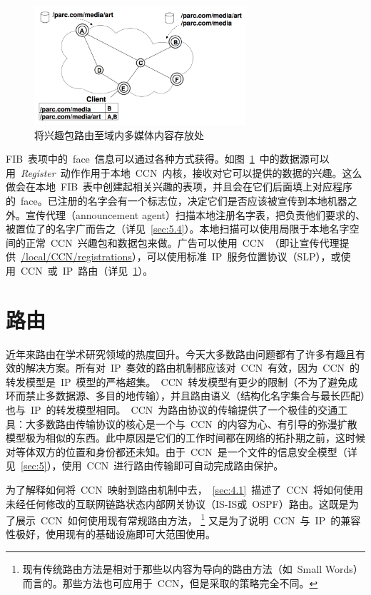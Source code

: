 \begin{figure}[htbp]
\begin{center}
\includegraphics[width=0.7\textwidth]{images/routing}
\caption{将兴趣包路由至域内多媒体内容存放处}
\label{routing}
\end{center}
\end{figure}

FIB~表项中的~face~信息可以通过各种方式获得。如图~\ref{routing}~中的数据源可以用~\emph{Register}~动作作用于本地~CCN~内核，接收对它可以提供的数据的兴趣。这么做会在本地~FIB~表中创建起相关兴趣的表项，并且会在它们后面填上对应程序的~face。已注册的名字会有一个标志位，决定它们是否应该被宣传到本地机器之外。宣传代理（announcement agent）扫描本地注册名字表，把负责他们要求的、被置位了的名字广而告之（详见~\ref{sec:5.4}）。本地扫描可以使用局限于本地名字空间的正常~CCN~兴趣包和数据包来做。广告可以使用~CCN~（即让宣传代理提供~\url{/local/CCN/registrations}），可以使用标准~IP~服务位置协议（SLP），或使用~CCN~或~IP~路由（详见~\ref{sec:4}）。%

\section{路由}
\label{sec:4}
近年来路由在学术研究领域的热度回升。今天大多数路由问题都有了许多有趣且有效的解决方案。所有对~IP~奏效的路由机制都应该对~CCN~有效，因为~CCN~的转发模型是~IP~模型的严格超集。~CCN~转发模型有更少的限制（不为了避免成环而禁止多数据源、多目的地传输），并且路由语义（结构化名字集合与最长匹配）也与~IP~的转发模型相同。~CCN~为路由协议的传输提供了一个极佳的交通工具：大多数路由传输协议的核心是一个与~CCN~的内容为心、有引导的弥漫扩散模型极为相似的东西。此中原因是它们的工作时间都在网络的拓扑期之前，这时候对等体双方的位置和身份都还未知。由于~CCN~是一个文件的信息安全模型（详见~\ref{sec:5}），使用~CCN~进行路由传输即可自动完成路由保护。

为了解释如何将~CCN~映射到路由机制中去，~\ref{sec:4.1}~描述了~CCN~将如何使用未经任何修改的互联网链路状态内部网关协议（IS-IS或~OSPF）路由。这既是为了展示~CCN~如何使用现有常规路由方法，
\renewcommand\baselinestretch{1} %
\footnote{现有传统路由方法是相对于那些以内容为导向的路由方法（如~Small Words）而言的。那些方法也可应用于~CCN，但是采取的策略完全不同。}
又是为了说明~CCN~与~IP~的兼容性极好，使用现有的基础设施即可大范围使用。


